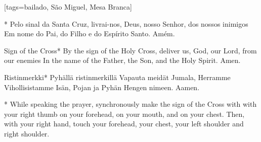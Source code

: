 %

\renewcommand{\thesongnum}{\Roman{songnum}}
\setcounter{songnum}{1}


[tags={bailado, São Miguel, Mesa Branca}]
  \begin{passage}[PT]{}*
    Pelo sinal da Santa Cruz,
    livrai-nos, Deus, nosso Senhor,
    dos nossos inimigos
    \polpar
    Em nome do Pai, do Filho e do Espírito Santo.
    \polpar
    Amém.
  \end{passage}
  \begin{passage}[EN]{Sign of the Cross}*
    By the sign of the Holy Cross,
    deliver us, God, our Lord,
    from our enemies
    \polpar
    In the name of the Father, the Son, and the Holy Spirit.
    \polpar
    Amen.
  \end{passage}
  \begin{passage}[FI]{Ristinmerkki}*
    Pyhällä ristinmerkillä
    Vapauta meidät Jumala, Herramme
    Vihollisistamme
    \polpar
    Isän, Pojan ja Pyhän Hengen nimeen.
    \polpar
    Aamen.
  \end{passage}
  \hardbrk
  \vspace*{\fill}
  \begin{passage}[NOTE]{}*
    While speaking the prayer, synchronously make
    the sign of the Cross with with your right thumb
    on your forehead,
    on your mouth, and
    on your chest.
    \polpar
    Then, with your right hand, touch
    your forehead,
    your chest,
    your left shoulder and right shoulder.
  \end{passage}
  \vspace*{\fill}
\endsong


